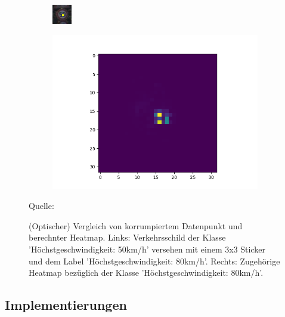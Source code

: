 \documentclass[11pt,a4paper]{article}
\newcommand{\source}[1]{\caption*{\small \hfill Quelle: {#1}} }
\numberwithin{equation}{section}
\begin{document}
	\begin{figure}
		\centering
		\begin{subfigure}{.5\textwidth}
			\centering
			\includegraphics[width=.4\linewidth]{1450_poison}
			
		\end{subfigure}%
		\begin{subfigure}{.5\textwidth}
			\centering
			\includegraphics[width=.7\linewidth]{1450_poison_lrp.png}
			
		\end{subfigure}
		\caption[(Optischer) Vergleich von korrumpiertem Datenpunkt und berechnter Heatmap.]{(Optischer) Vergleich von korrumpiertem Datenpunkt und berechnter Heatmap. Links: Verkehrsschild der Klasse 'Höchstgeschwindigkeit: 50km/h' versehen mit einem 3x3 Sticker und dem Label 'Höchstgeschwindigkeit: 80km/h'. Rechts: Zugehörige Heatmap bezüglich der Klasse 'Höchstgeschwindigkeit: 80km/h'.}
		\source{\cite{AC}}
		
		\label{vergleich_original_lrp}
	\end{figure}
	\subsection{Implementierungen}
	
\end{document}
